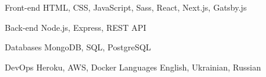 

\begin{cvskills}
  \cvskill
    {Front-end} %
    {HTML, CSS, JavaScript, Sass, React, Next.js, Gatsby.js } %

  \cvskill
    {Back-end} %
    {Node.js, Express, REST API} %

  \cvskill
    {Databases} %
    {MongoDB, SQL, PostgreSQL} %

  \cvskill
    {DevOps} %
    {Heroku, AWS, Docker} %
  \cvskill
    {Languages} %
    {English, Ukrainian, Russian} %

\end{cvskills}
